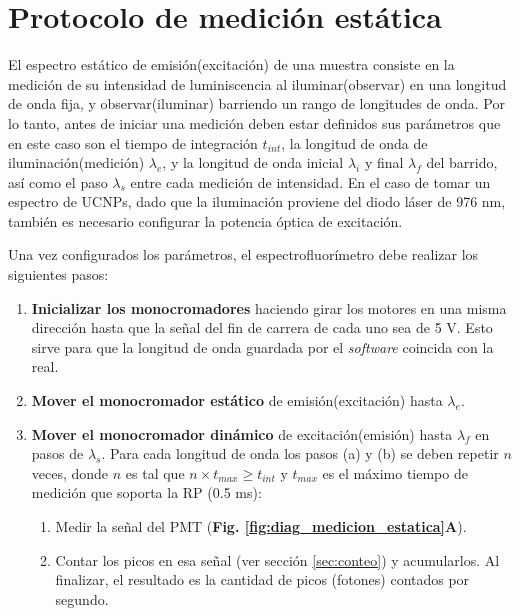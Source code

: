 
\section{Protocolo de medición estática}

El espectro estático de emisión(excitación) de una muestra consiste en la medición de su intensidad de luminiscencia al iluminar(observar) en una longitud de onda fija, y observar(iluminar) barriendo un rango de longitudes de onda.
Por lo tanto, antes de iniciar una medición deben estar definidos sus parámetros que en este caso son el tiempo de integración $t_{int}$, la longitud de onda de iluminación(medición) $\lambda_e$, y la longitud de onda inicial $\lambda_i$ y final $\lambda_f$ del barrido, así como el paso $\lambda_s$ entre cada medición de intensidad.
En el caso de tomar un espectro de UCNPs, dado que la iluminación proviene del diodo láser de 976 nm, también es necesario configurar la potencia óptica de excitación.

Una vez configurados los parámetros, el espectrofluorímetro debe realizar los siguientes pasos:

\begin{enumerate}
     \item \textbf{Inicializar los monocromadores} haciendo girar los motores en una misma dirección hasta que la señal del fin de carrera de cada uno sea de 5 V. Esto sirve para que la longitud de onda guardada por el \textit{software} coincida con la real.
     \item \textbf{Mover el monocromador estático} de emisión(excitación) hasta $\lambda_e$. 
     \item \textbf{Mover el monocromador dinámico} de excitación(emisión) hasta $\lambda_f$ en pasos de $\lambda_s$. Para cada longitud de onda los pasos (a) y (b) se deben repetir  $n$ veces, donde $n$ es tal que $n \times t_{max} \geq t_{int}$ y $t_{max}$ es el máximo tiempo de medición que soporta la RP (0.5 ms):
     \begin{enumerate}
          \item Medir la señal del PMT (\textbf{Fig. \ref{fig:diag_medicion_estatica}A}).
          \item Contar los picos en esa señal (ver sección \ref{sec:conteo}) y acumularlos. Al finalizar, el resultado es la cantidad de picos (fotones) contados por segundo.
     \end{enumerate}
\end{enumerate}

